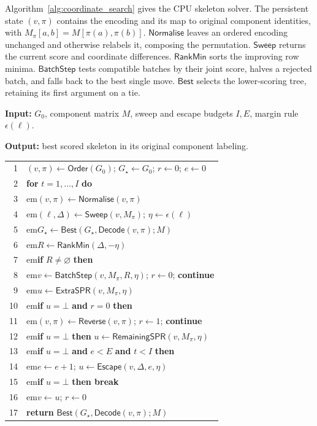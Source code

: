 \documentclass[11pt,a4paper]{article}
\makeatletter
\newcommand{\algindent}[1]{\hangindent=#1em\hangafter=1\hspace*{#1em}}
\newcommand{\proc}[1]{\mathsf{#1}}
\DeclareRobustCommand{\_}{\ifmmode\nfss@text{\textunderscore}\else\textunderscore\allowbreak\fi}
\theoremstyle{definition}
\makeatother
\begin{document}
Algorithm~\ref{alg:coordinate_search} gives the CPU skeleton solver.
The persistent state $(v,\pi)$ contains the encoding and its map to original component identities, with $M_\pi[a,b]=M[\pi(a),\pi(b)]$.
$\proc{Normalise}$ leaves an ordered encoding unchanged and otherwise relabels it, composing the permutation.
$\proc{Sweep}$ returns the current score and coordinate differences. $\proc{RankMin}$ sorts the improving row minima.
$\proc{BatchStep}$ tests compatible batches by their joint score, halves a rejected batch, and falls back to the best single move.
$\proc{Best}$ selects the lower-scoring tree, retaining its first argument on a tie.

\begin{algorithm}[!htbp]
\caption{CPU skeleton search}
\label{alg:coordinate_search}
\small
\textbf{Input:} $G_0$, component matrix $M$, sweep and escape budgets $I,E$, margin rule $\epsilon(\ell)$.\par
\textbf{Output:} best scored skeleton in its original component labeling.\par\smallskip
\begin{tabular}{@{}r@{\quad}>{\raggedright\arraybackslash}p{.93\linewidth}@{}}
1 & $(v,\pi)\gets\proc{Order}(G_0)$; $G_\star\gets G_0$; $r\gets0$; $e\gets0$\\
2 & \textbf{for} $t=1,\ldots,I$ \textbf{do}\\
3 & \algindent{1}$(v,\pi)\gets\proc{Normalise}(v,\pi)$\\
4 & \algindent{1}$(\ell,\Delta)\gets\proc{Sweep}(v,M_\pi)$; $\eta\gets\epsilon(\ell)$\\
5 & \algindent{1}$G_\star\gets\proc{Best}(G_\star,\proc{Decode}(v,\pi);M)$\\
6 & \algindent{1}$R\gets\proc{RankMin}(\Delta,-\eta)$\\
7 & \algindent{1}\textbf{if} $R\ne\varnothing$ \textbf{then}\\
8 & \algindent{2}$v\gets\proc{BatchStep}(v,M_\pi,R,\eta)$; $r\gets0$; \textbf{continue}\\
9 & \algindent{1}$u\gets\proc{ExtraSPR}(v,M_\pi,\eta)$\\
10 & \algindent{1}\textbf{if} $u=\bot$ \textbf{and} $r=0$ \textbf{then}\\
11 & \algindent{2}$(v,\pi)\gets\proc{Reverse}(v,\pi)$; $r\gets1$; \textbf{continue}\\
12 & \algindent{1}\textbf{if} $u=\bot$ \textbf{then} $u\gets\proc{RemainingSPR}(v,M_\pi,\eta)$\\
13 & \algindent{1}\textbf{if} $u=\bot$ \textbf{and} $e<E$ \textbf{and} $t<I$ \textbf{then}\\
14 & \algindent{2}$e\gets e+1$; $u\gets\proc{Escape}(v,\Delta,e,\eta)$\\
15 & \algindent{1}\textbf{if} $u=\bot$ \textbf{then break}\\
16 & \algindent{1}$v\gets u$; $r\gets0$\\
17 & \textbf{return} $\proc{Best}(G_\star,\proc{Decode}(v,\pi);M)$\\
\end{tabular}
\end{algorithm}
\end{document}
